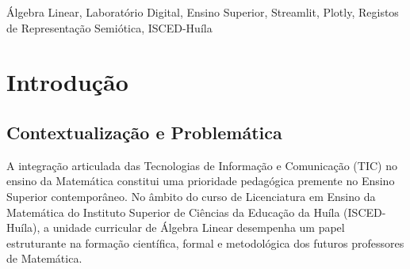 \documentclass[conference]{IEEEtran}
\begin{document}
\maketitle

\begin{abstract}
O ensino da Álgebra Linear no Ensino Superior enfrenta desafios decorrentes do elevado nível de abstracção teórica e da dificuldade dos estudantes em coordenar registos de representação algébricos, numéricos e gráficos. Para responder a esta problemática educacional no contexto do ISCED-Huíla, este artigo apresenta o desenvolvimento e a avaliação empírica do LIDAL (Laboratório Interactivo Digital de Álgebra Linear), uma plataforma web interactiva concebida em Python com os frameworks Streamlit, NumPy, SymPy e Plotly. O ecossistema está organizado em seis módulos matemáticos nucleares, complementados por módulos de exploração gráfica livre, gamificação e conteúdo teórico, e fundamenta-se numa sequência didáctica interactiva baseada no ciclo Explorar--Observar--Interpretar--Experimentar--Verificar. A metodologia seguiu um estudo de caso misto com 32 estudantes do 1.\textordmasculine{} Ano da licenciatura em Ensino da Matemática do ISCED-Huíla. Os resultados quantitativos demonstraram um ganho de aprendizagem estatisticamente significativo do pré-teste para o pós-teste (aumento da média de 42,5\% para 81,2\%, $p < 0{,}001$, $d = 3{,}92$) e uma apreciação altamente favorável nos critérios pedagógicos e de usabilidade (superior a 90\% de concordância). Conclui-se que a mediação tecnológica promovida pelo LIDAL fortalece a intuição geométrica e a capacidade conceptual na resolução de problemas matriciais e vectoriais.
\end{abstract}

\begin{IEEEkeywords}
Álgebra Linear, Laboratório Digital, Ensino Superior, Streamlit, Plotly, Registos de Representação Semiótica, ISCED-Huíla
\end{IEEEkeywords}

\section{Introdução}

\subsection{Contextualização e Problemática}

A integração articulada das Tecnologias de Informação e Comunicação (TIC) no ensino da Matemática constitui uma prioridade pedagógica premente no Ensino Superior contemporâneo. No âmbito do curso de Licenciatura em Ensino da Matemática do Instituto Superior de Ciências da Educação da Huíla (ISCED-Huíla), a unidade curricular de Álgebra Linear desempenha um papel estruturante na formação científica, formal e metodológica dos futuros professores de Matemática.
\end{document}
